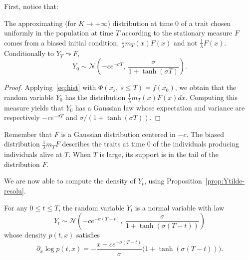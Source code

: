 \documentclass[10pt]{amsart}
\theoremstyle{definition}\newtheorem{defi}[theo]{Definition}\newtheorem{rema}[theo]{Remark}\newtheorem{exam}[theo]{Example}\newtheorem{exem}[theo]{Example}\newtheorem{nota}[theo]{Notation}
\providecommand{\No}{}
\renewcommand{\No}{\mathcal{N}}
\begin{document}

First, notice that:

\begin{prop}
The approximating {(for $K\rightarrow +\infty$)} distribution at time $0$ of a trait chosen uniformly in the population at time $T$ according to the stationary measure $F$ comes from a biased initial condition, $\frac{1}{\lambda}m_T(x)F(x)$ and not $\frac{1}{\lambda}F(x)$. Conditionally to $Y_T\leadsto F$,
\begin{equation}\label{Y0}
Y_{0}\sim \No\left(- c e^{-\sigma T},\ \frac{\sigma}{1+\tanh(\sigma T)}\right).
\end{equation}
\end{prop}

\begin{proof}
Applying~\eqref{eq:hist} with $\Phi(x_{s},\ s\leq T) = f(x_{0})$, we obtain that the random variable $Y_{0}$ has the distribution $\frac{1}{\lambda}m_T(x)F(x)dx$. Computing this measure yields that $Y_{0}$ has a Gaussian law whose expectation and variance are respectively $-ce^{-\sigma T}$ and $\sigma/(1+\tanh(\sigma T))$.
\end{proof}


Remember that $F$ is a Gaussian distribution centered in $-c$. The biased distribution $\frac{1}{\lambda} m_{T}F$ describes the traits at time $0$ of the individuals producing individuals alive at $T$. When $T$ is large, its support is in the tail of the distribution $F$.





We are now able to compute the density of $Y_{t}$, using Proposition~\ref{prop:Ytilde-resolu}.

\begin{prop}
For any $0\leq t\leq T$, the random variable $Y_{t}$ is a normal variable with law
\[
Y_{t}\sim \No\left(-ce^{-\sigma (T-t)},\ \frac{\sigma}{1+\tanh(\sigma(T-t))}\right)
\]
whose density $p(t,x)$ satisfies
\[
\partial_{x}\log p(t,x)=-\frac{x+ce^{-\sigma(T-t)}}{\sigma}\big(1+\tanh(\sigma(T-t)) \big).
\]
\end{prop}

\end{document}
